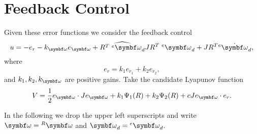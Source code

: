 \section{Feedback Control}

\begin{tcolorbox}
  Given these error functions we consider the feedback control
  \begin{equation}
    \label{eq:feedback}
    u = -e_r - k_\bomega e_\bomega + \widehat{R^T \; {^e\bomega_d}} J R^T \; {^e\bomega_d} + J R^T {^e\dot \bomega_d},
  \end{equation}
  where
  \begin{equation}
    \label{eq:er}
    e_r = k_1 e_{r_1} + k_2 e_{r_2},
  \end{equation}
  and $k_1, k_2, k_\bomega$ are positive gains. Take the candidate Lyapunov function
  \begin{equation}
    V = \frac{1}{2} e_\bomega \cdot J e_\bomega + k_1 \Psi_1(R) + k_2 \Psi_2(R) + c J e_\bomega \cdot e_r.
  \end{equation}
\end{tcolorbox}

In the following we drop the upper left superscripts and write $\bomega = {^R\bomega}$ and $\bomega_d = {^e\bomega_d}$.


